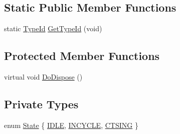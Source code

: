 \subsection*{Static Public Member Functions}
\begin{DoxyCompactItemize}
\item 
static \hyperlink{classns3_1_1TypeId}{Type\+Id} \hyperlink{classns3_1_1UanMacRcGw_a2e43f95acb5fa3847daf1883233fe791}{Get\+Type\+Id} (void)
\end{DoxyCompactItemize}
\subsection*{Protected Member Functions}
\begin{DoxyCompactItemize}
\item 
virtual void \hyperlink{classns3_1_1UanMacRcGw_a1404848da08e761be9ad80a2b4ae023e}{Do\+Dispose} ()
\end{DoxyCompactItemize}
\subsection*{Private Types}
\begin{DoxyCompactItemize}
\item 
enum \hyperlink{classns3_1_1UanMacRcGw_a72bafb41afd28b05cb9906d5c1f42e2d}{State} \{ \hyperlink{classns3_1_1UanMacRcGw_a72bafb41afd28b05cb9906d5c1f42e2da8cd582d760976a9b3719d7a6405661dd}{I\+D\+LE}, 
\hyperlink{classns3_1_1UanMacRcGw_a72bafb41afd28b05cb9906d5c1f42e2da17d37d390d3d07c9a5ca83303f23cc90}{I\+N\+C\+Y\+C\+LE}, 
\hyperlink{classns3_1_1UanMacRcGw_a72bafb41afd28b05cb9906d5c1f42e2da01f2fcfc2e9efdccbbc058daa9d2ac44}{C\+T\+S\+I\+NG}
 \}
\end{DoxyCompactItemize}
